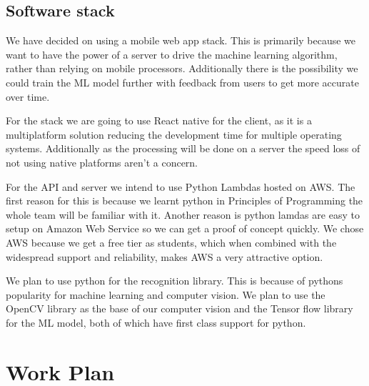 \documentclass[10pt]{article}
\begin{document}
  \subsection{Software stack}
  
  We have decided on using a mobile web app stack. This is primarily because we want to have the 
  power of a server to drive the machine learning algorithm, rather than relying on mobile 
  processors. Additionally there is the possibility we could train the ML model further with 
  feedback from users to get more accurate over time.

  For the stack we are going to use React native for the client, as it is a multiplatform solution 
  reducing the development time for multiple operating systems. Additionally as the processing will 
  be done on a server the speed loss of not using native platforms aren't a concern.

  For the API and server we intend to use Python Lambdas hosted on AWS. The first reason for this is 
  because we learnt python in Principles of Programming the whole team will be familiar with it. 
  Another reason is python lamdas are easy to setup on Amazon Web Service so we can get a proof of 
  concept quickly. We chose AWS because we get a free tier as students, which when combined with the 
  widespread support and reliability, makes AWS a very attractive option.

  We plan to use python for the recognition library. This is because of pythons popularity for 
  machine learning and computer vision. We plan to use the OpenCV library as the base of our 
  computer vision and the Tensor flow library for the ML model, both of which have first class 
  support for python.

  \section{Work Plan}
\end{document}
